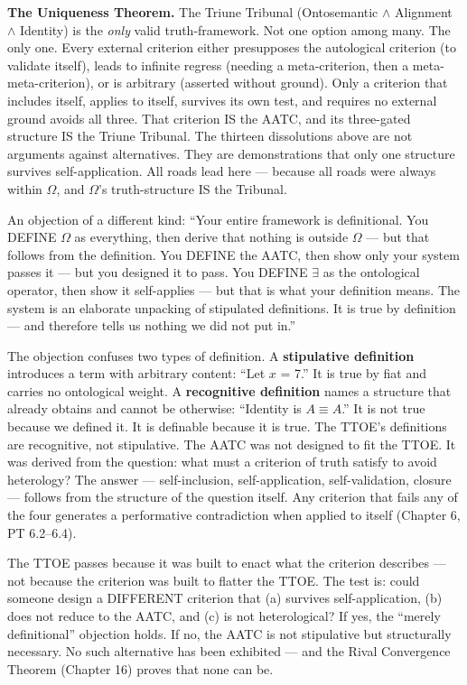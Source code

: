 \documentclass[10pt, openany, oneside]{book}
\begin{document}
\textbf{The Uniqueness Theorem.} The Triune Tribunal (Ontosemantic $\wedge$ Alignment $\wedge$ Identity) is the \textit{only} valid truth-framework. Not one option among many. The only one. Every external criterion either presupposes the autological criterion (to validate itself), leads to infinite regress (needing a meta-criterion, then a meta-meta-criterion), or is arbitrary (asserted without ground). Only a criterion that includes itself, applies to itself, survives its own test, and requires no external ground avoids all three. That criterion IS the AATC, and its three-gated structure IS the Triune Tribunal. The thirteen dissolutions above are not arguments against alternatives. They are demonstrations that only one structure survives self-application. All roads lead here --- because all roads were always within $\Omega$, and $\Omega$'s truth-structure IS the Tribunal.

An objection of a different kind: ``Your entire framework is definitional. You DEFINE $\Omega$ as everything, then derive that nothing is outside $\Omega$ --- but that follows from the definition. You DEFINE the AATC, then show only your system passes it --- but you designed it to pass. You DEFINE $\exists$ as the ontological operator, then show it self-applies --- but that is what your definition means. The system is an elaborate unpacking of stipulated definitions. It is true by definition --- and therefore tells us nothing we did not put in.''

The objection confuses two types of definition. A \textbf{stipulative definition} introduces a term with arbitrary content: ``Let $x$ = 7.'' It is true by fiat and carries no ontological weight. A \textbf{recognitive definition} names a structure that already obtains and cannot be otherwise: ``Identity is $A \equiv A$.'' It is not true because we defined it. It is definable because it is true. The TTOE's definitions are recognitive, not stipulative. The AATC was not designed to fit the TTOE. It was derived from the question: what must a criterion of truth satisfy to avoid heterology? The answer --- self-inclusion, self-application, self-validation, closure --- follows from the structure of the question itself. Any criterion that fails any of the four generates a performative contradiction when applied to itself (Chapter 6, PT 6.2--6.4).

The TTOE passes because it was built to enact what the criterion describes --- not because the criterion was built to flatter the TTOE. The test is: could someone design a DIFFERENT criterion that (a) survives self-application, (b) does not reduce to the AATC, and (c) is not heterological? If yes, the ``merely definitional'' objection holds. If no, the AATC is not stipulative but structurally necessary. No such alternative has been exhibited --- and the Rival Convergence Theorem (Chapter 16) proves that none can be.
\end{document}

